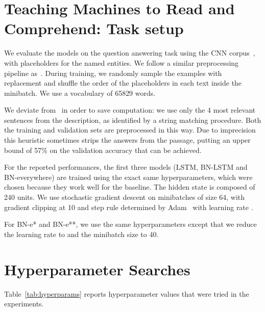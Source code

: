 \documentclass{article} \pdfoutput=1 \usepackage[utf8]{inputenc}
\begin{document}
\section{Teaching Machines to Read and Comprehend: Task setup} \label{sec:more-attr}

We evaluate the models on the question answering task using the CNN corpus~\citep{attentivereader},
with placeholders for the named entities. We follow a similar preprocessing
pipeline as~\citet{attentivereader}.  During training, we randomly sample the
examples with replacement and shuffle the order of the placeholders in each
text inside the minibatch.  We use a vocabulary of 65829 words.

We deviate from~\citet{attentivereader} in order to save computation:
we use only the 4 most relevant sentences from the description,
as identified by a string matching procedure.
Both the training and validation sets are preprocessed in this way.
Due to imprecision this heuristic sometimes strips the answers from the passage,
putting an upper bound of 57\% on the validation accuracy that can be achieved.

For the reported performances, the first three models (LSTM, BN-LSTM and BN-everywhere) are trained using the
exact same hyperparameters, which were chosen because they work well for the
baseline.  The hidden state is composed of 240 units.  We use stochastic
gradient descent on minibatches of size 64, with gradient clipping at 10 and
step rule determined by Adam~\citep{kingma2014adam} with learning rate .

For BN-e* and BN-e**, we use the same hyperparameters except that we reduce the
learning rate to  and the minibatch size to 40.

\section{Hyperparameter Searches}

Table~\ref{tab:hyperparams} reports hyperparameter values that were tried in the experiments.
\end{document}
